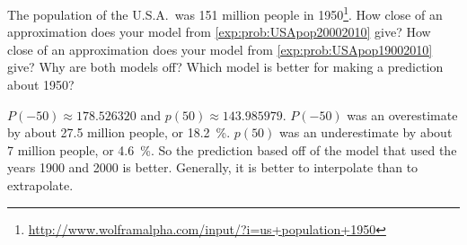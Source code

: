 \begin{problem}[US population]
\begin{subproblem}
\begin{shortsolution}
	\end{shortsolution}
\end{subproblem}
\begin{subproblem}
	The population of the U.S.A.\ was 151 million people in 1950\footnote{\href{http://www.wolframalpha.com/input/?i=us+population+1950}{http://www.wolframalpha.com/input/?i=us+population+1950}}. How close of an approximation does your model from \cref{exp:prob:USApop20002010} give? How close of an approximation does your model from \cref{exp:prob:USApop19002010} give? 	Why are both models off?  Which model is better for making a prediction about 1950?
	\begin{shortsolution}
		$P(-50) \approx 178.526320$ and $p(50)\approx 143.985979$.  $P(-50)$ was an overestimate by about 27.5 million people, or \SI{18.2}{\percent}.  $p(50)$ was an underestimate by about 7 million people, or \SI{4.6}{\percent}.  So the prediction based off of the model that used the years 1900 and 2000 is better.  Generally, it is better to interpolate than to extrapolate.
	\end{shortsolution}
\end{subproblem}		
\end{problem}
			
